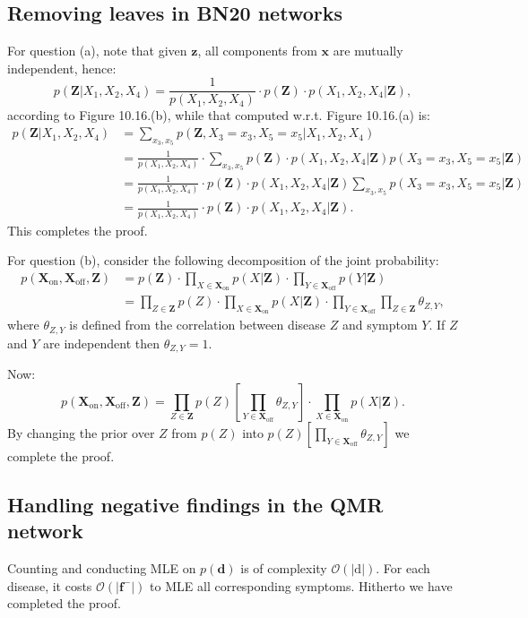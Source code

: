 \documentclass[UTF8]{ctexart}
\begin{document}
\subsection{Removing leaves in BN20 networks}
For question (a), note that given $\textbf{z}$, all components from $\textbf{x}$ are mutually independent, hence:
$$p(\textbf{Z}|X_{1},X_{2},X_{4})=\frac{1}{p(X_{1},X_{2},X_{4})}\cdot p(\textbf{Z})\cdot p(X_{1},X_{2},X_{4}|\textbf{Z}),$$
according to Figure 10.16.(b), while that computed w.r.t. Figure 10.16.(a) is:
$$
\begin{aligned}
p(\textbf{Z}|X_{1},X_{2},X_{4})&=\sum_{x_{3},x_{5}}p(\textbf{Z},X_{3}=x_{3},X_{5}=x_{5}|X_{1},X_{2},X_{4})\\
&=\frac{1}{p(X_{1},X_{2},X_{4})}\cdot\sum_{x_{3},x_{5}} p(\textbf{Z})\cdot p(X_{1},X_{2},X_{4}|\textbf{Z})p(X_{3}=x_{3},X_{5}=x_{5}|\textbf{Z})\\
&=\frac{1}{p(X_{1},X_{2},X_{4})}\cdot p(\textbf{Z})\cdot p(X_{1},X_{2},X_{4}|\textbf{Z})\sum_{x_{3},x_{5}}p(X_{3}=x_{3},X_{5}=x_{5}|\textbf{Z})\\
&=\frac{1}{p(X_{1},X_{2},X_{4})}\cdot p(\textbf{Z})\cdot p(X_{1},X_{2},X_{4}|\textbf{Z}).
\end{aligned}
$$
This completes the proof.

For question (b), consider the following decomposition of the joint probability:
$$
\begin{aligned}
p(\textbf{X}_{\text{on}},\textbf{X}_{\text{off}},\textbf{Z})&=p(\textbf{Z})\cdot\prod_{X\in\textbf{X}_{\text{on}}}p(X|\textbf{Z})\cdot\prod_{Y\in\textbf{X}_{\text{off}}}p(Y|\textbf{Z})\\
&=\prod_{Z\in\textbf{Z}}p(Z)\cdot\prod_{X\in\textbf{X}_{\text{on}}}p(X|\textbf{Z})\cdot\prod_{Y\in\textbf{X}_{\text{off}}}\prod_{Z\in\textbf{Z}}\theta_{Z,Y},
\end{aligned}
$$
where $\theta_{Z,Y}$ is defined from the correlation between disease $Z$ and symptom $Y$.
If $Z$ and $Y$ are independent then $\theta_{Z,Y}=1$.

Now:
$$p(\textbf{X}_{\text{on}},\textbf{X}_{\text{off}},\textbf{Z})=\prod_{Z\in\textbf{Z}}p(Z)\left[\prod_{Y\in\textbf{X}_{\text{off}}}\theta_{Z,Y} \right]\cdot\prod_{X\in\textbf{X}_{\text{on}}}p(X|\textbf{Z}).$$
By changing the prior over $Z$ from $p(Z)$ into $p(Z)\left[\prod_{Y\in\textbf{X}_{\text{off}}}\theta_{Z,Y} \right]$ we complete the proof.

\subsection{Handling negative findings in the QMR network}
Counting and conducting MLE on $p(\textbf{d})$ is of complexity $\mathcal{O}(|\text{d}|)$.
For each disease, it costs $\mathcal{O}(|\textbf{f}^{-}|)$ to MLE all corresponding symptoms.
Hitherto we have completed the proof.
\end{document}
